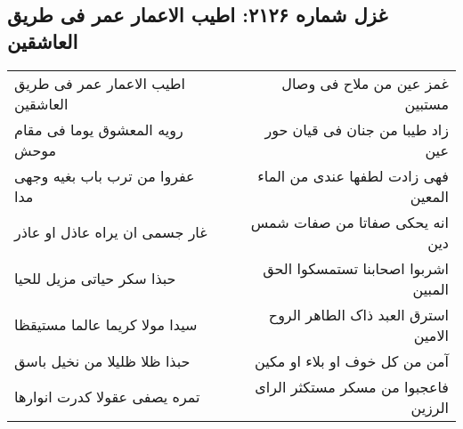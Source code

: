 \begin{center}
\section*{غزل شماره ۲۱۲۶: اطیب الاعمار عمر فی طریق العاشقین}
\label{sec:2126}
\begin{longtable}{l p{0.5cm} r}
اطیب الاعمار عمر فی طریق العاشقین
&&
غمز عین من ملاح فی وصال مستبین
\\
رویه المعشوق یوما فی مقام موحش
&&
زاد طیبا من جنان فی قیان حور عین
\\
عفروا من ترب باب بغیه وجهی مدا
&&
فهی زادت لطفها عندی من الماء المعین
\\
غار جسمی ان یراه عاذل او عاذر
&&
انه یحکی صفاتا من صفات شمس دین
\\
حبذا سکر حیاتی مزیل للحیا
&&
اشربوا اصحابنا تستمسکوا الحق المبین
\\
سیدا مولا کریما عالما مستیقظا
&&
استرق العبد ذاک الطاهر الروح الامین
\\
حبذا ظلا ظلیلا من نخیل باسق
&&
آمن من کل خوف او بلاء او مکین
\\
تمره یصفی عقولا کدرت انوارها
&&
فاعجبوا من مسکر مستکثر الرای الرزین
\\
\end{longtable}
\end{center}

